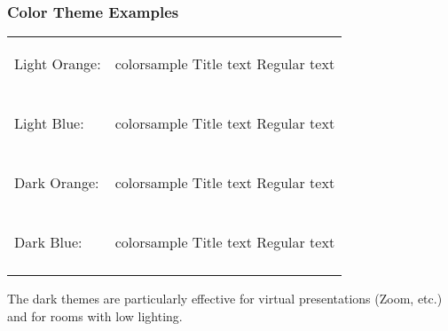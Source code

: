 \documentclass[10pt, aspectratio=169]{oden_beamer}
\begin{document}
\begin{frame} %
\frametitle{Color Theme Examples}

\begin{center}
\begin{tabular}{lr}
    Light Orange: &
        \setbeamercolor{colorsample}{bg=white,fg=charcoal}
        \begin{beamercolorbox}[wd=5cm,ht=.5cm,dp=.25cm,center]{colorsample}
            \textcolor{burnt_orange}{Title text} Regular text
        \end{beamercolorbox}
    \\ \\
    Light Blue: &
        \setbeamercolor{colorsample}{bg=white,fg=charcoal}
        \begin{beamercolorbox}[wd=5cm,ht=.5cm,dp=.25cm,center]{colorsample}
            \textcolor{oden_blue_dark}{Title text} Regular text
        \end{beamercolorbox}
    \\ \\
    Dark Orange: &
        \setbeamercolor{colorsample}{bg=charcoal,fg=chalk}
        \begin{beamercolorbox}[wd=5cm,ht=.5cm,dp=.25cm,center]{colorsample}
            \textcolor{accent_orange}{Title text} Regular text
        \end{beamercolorbox}
    \\ \\
    Dark Blue: &
        \setbeamercolor{colorsample}{bg=charcoal,fg=chalk}
        \begin{beamercolorbox}[wd=5cm,ht=.5cm,dp=.25cm,center]{colorsample}
            \textcolor{oden_blue}{Title text} Regular text
        \end{beamercolorbox}
    \\ \\
\end{tabular}
\end{center}

The dark themes are particularly effective for virtual presentations (Zoom, etc.) and for rooms with low lighting.
\end{frame}
\end{document}
